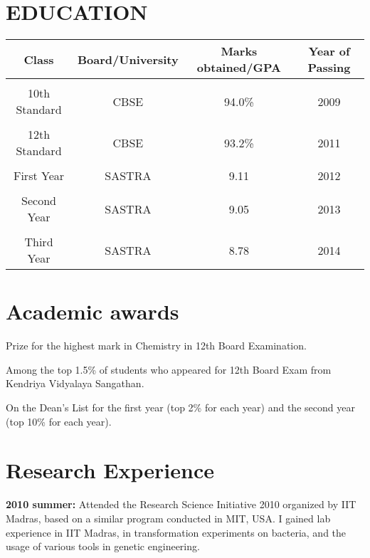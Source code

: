 \documentclass{res}
\begin{document}
 
\thispagestyle{empty} %
\address{C7-4, 5th Cross Road\\
IIT Campus, Chennai, 600036\\
amogh.jalihal@gmail.com}


\begin{resume}

\section{EDUCATION}
\vspace{0.1in} 
 
    \begin{tabular}{c c c c}
	\textbf{Class} & \textbf{Board/University} & \textbf{Marks obtained/GPA} & \textbf{Year of Passing} \\ 
 \hline \\
	10th Standard & CBSE & 94.0\% & 2009 \\ \\
	12th Standard & CBSE & 93.2\% & 2011 \\ \\
	First Year & SASTRA & 9.11 & 2012\\ \\
	Second Year & SASTRA & 9.05 & 2013 \\ \\ 
	Third Year & SASTRA & 8.78 & 2014 \\
\hline
 
	\end{tabular}

\section{Academic awards}
\vspace{0.1in}
Prize for the highest mark in Chemistry in 12th Board Examination.

Among the top 1.5\% of students who appeared for 12th Board Exam from Kendriya Vidyalaya Sangathan.

On the Dean's List for the first year (top 2\% for each year) and the second year (top 10\% for each year).


\section{Research Experience} 
\vspace{0.1in}
{\bf 2010 summer:} Attended the Research Science Initiative 2010 organized by IIT Madras, based on a similar program conducted in MIT, USA. I gained lab experience in IIT Madras, in transformation experiments on bacteria, and the usage of various tools in genetic engineering.


\end{resume}
\end{document}
